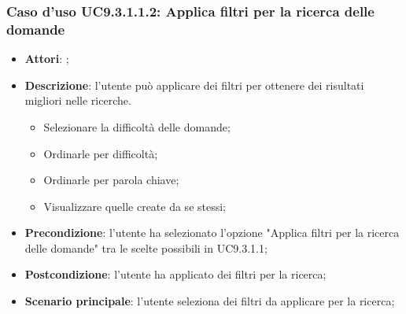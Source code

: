 		 \subsubsection{Caso d'uso UC9.3.1.1.2: Applica filtri per la ricerca delle domande}
		 \label{UC9.3.1.1.2}
		 \begin{itemize}
		 	\item \textbf{Attori}: \uaupro;
		 	\item \textbf{Descrizione}: l'utente può applicare dei filtri per ottenere dei risultati migliori nelle ricerche. 
			 	\begin{itemize}
					\item Selezionare la difficoltà delle domande;
					\item Ordinarle per difficoltà;
					\item Ordinarle per parola chiave;
					\item Visualizzare quelle create da se stessi;
			 	\end{itemize}
		 	\item \textbf{Precondizione}: l'utente ha selezionato l'opzione "Applica filtri per la ricerca delle domande" tra le scelte possibili in UC9.3.1.1;
		 	\item \textbf{Postcondizione}: l'utente ha applicato dei filtri per la ricerca; 
		 	\item \textbf{Scenario principale}: l'utente seleziona dei filtri da applicare per la ricerca;
		 \end{itemize}
		 
